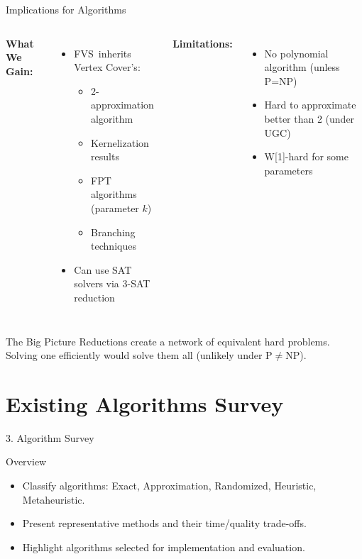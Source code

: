 \documentclass[aspectratio=169]{beamer}
\newcommand{\fvs}{\textsc{FVS}}
\begin{document}
\begin{frame}{Implications for Algorithms}
  \begin{columns}[T]
    \textbf{What We Gain:}
    \begin{itemize}
      \item \fvs\ inherits Vertex Cover's:
      \begin{itemize}
        \item 2-approximation algorithm
        \item Kernelization results
        \item FPT algorithms (parameter $k$)
        \item Branching techniques
      \end{itemize}
      \item Can use SAT solvers via 3-SAT reduction
    \end{itemize}
    
    \textbf{Limitations:}
    \begin{itemize}
      \item No polynomial algorithm (unless P=NP)
      \item Hard to approximate better than 2 (under UGC)
      \item W[1]-hard for some parameters
    \end{itemize}
  \end{columns}
  
  \vspace{0.8cm}
  
	\begin{alertblock}{The Big Picture}
		Reductions create a network of equivalent hard problems. Solving one efficiently would solve them all (unlikely under $\mathrm{P} \neq \mathrm{NP}$).
	\end{alertblock}
\end{frame}





\section{Existing Algorithms Survey}


\begin{frame}{3. Algorithm Survey}
	\begin{block}{Overview}
		\begin{itemize}
			\item Classify algorithms: Exact, Approximation, Randomized, Heuristic, Metaheuristic.
			\item Present representative methods and their time/quality trade-offs.
			\item Highlight algorithms selected for implementation and evaluation.
		\end{itemize}
	\end{block}
\end{frame}
\end{document}
